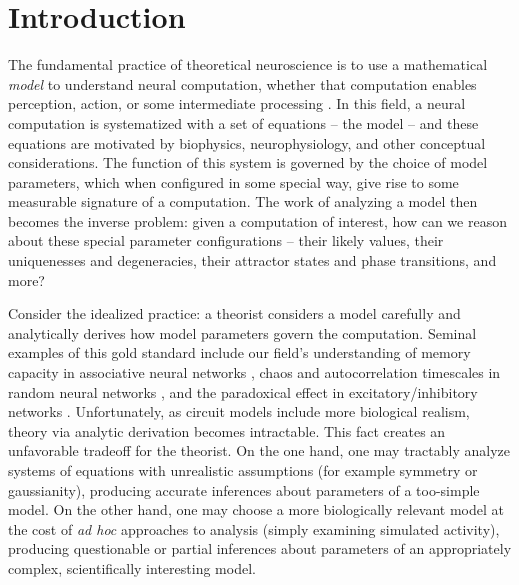\documentclass[11pt]{article}
\begin{document}
\section{Introduction}

The fundamental practice of theoretical neuroscience is to use a mathematical \emph{model} to understand neural computation, whether that computation enables perception, action, or some intermediate processing \cite{abbott2008theoretical}.  
In this field, a neural computation is systematized with a set of equations -- the model -- and these equations are motivated by biophysics, neurophysiology, and other conceptual considerations.
The function of this system is governed by the choice of model parameters, which when configured in some special way, give rise to some measurable signature of a computation.   
The work of analyzing a model then becomes the inverse problem: given a computation of interest, how can we reason about these special parameter configurations -- their likely values, their uniquenesses and degeneracies, their attractor states and phase transitions, and more?  

Consider the idealized practice: a theorist considers a model carefully and analytically derives how model parameters govern the computation.  
Seminal examples of this gold standard include our field's understanding of memory capacity in associative neural networks \cite{hopfield1984neurons}, chaos and autocorrelation timescales in random neural networks \cite{sompolinsky1988chaos}, and the paradoxical effect in excitatory/inhibitory networks \cite{tsodyks1997paradoxical}.  
Unfortunately, as circuit models include more biological realism, theory via analytic derivation becomes intractable.  
This fact creates an unfavorable tradeoff for the theorist.  On the one hand, one may tractably analyze systems of equations with unrealistic assumptions (for example symmetry or gaussianity), producing accurate inferences about parameters of a too-simple model.  On the other hand, one may choose a more biologically relevant model at the cost of \emph{ad hoc} approaches to analysis (simply examining simulated activity), producing questionable or partial inferences about parameters of an appropriately complex, scientifically interesting model.  %
\end{document}
